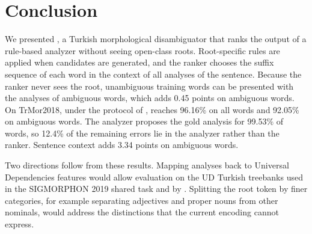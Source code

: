 \section{Conclusion}
\label{sec:conclusion}

We presented \savyar{}, a Turkish morphological disambiguator that ranks the output of a rule-based analyzer without seeing open-class roots. Root-specific rules are applied when candidates are generated, and the ranker chooses the suffix sequence of each word in the context of all analyses of the sentence. Because the ranker never sees the root, unambiguous training words can be presented with the analyses of ambiguous words, which adds 0.45 points on ambiguous words. On TrMor2018, under the protocol of \citet{akyurek-etal-2019-morphological}, \savyar{} reaches 96.16\% on all words and 92.05\% on ambiguous words. The analyzer proposes the gold analysis for 99.53\% of words, so 12.4\% of the remaining errors lie in the analyzer rather than the ranker. Sentence context adds 3.34 points on ambiguous words.

Two directions follow from these results. Mapping \savyar{} analyses back to Universal Dependencies features would allow evaluation on the UD Turkish treebanks used in the SIGMORPHON 2019 shared task \citep{mccarthy-etal-2019-sigmorphon} and by \citet{can-etal-2022-joint}. Splitting the root token by finer categories, for example separating adjectives and proper nouns from other nominals, would address the distinctions that the current encoding cannot express.
